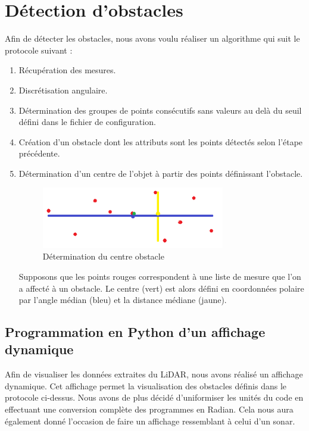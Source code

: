 \section{Détection d'obstacles}

Afin de détecter les obstacles, nous avons voulu réaliser un algorithme qui suit le protocole suivant :
\begin{enumerate}
    \item Récupération des mesures.
    \item Discrétisation angulaire.
    \item Détermination des groupes de points consécutifs sans valeurs au delà du seuil défini dans le fichier de configuration.
    \item Création d'un obstacle dont les attributs sont les points détectés selon l'étape précédente.
    \item Détermination d'un centre de l'objet à partir des points définissant l'obstacle.
    \begin{figure}[htp]
    \centering
    \includegraphics[width=8cm]{images/Detection/centre-object.png}
    \caption{Détermination du centre obstacle}
\end{figure}
\newline
Supposons que les points rouges correspondent à une liste de mesure que l'on a affecté à un obstacle. Le centre (vert) est alors défini en coordonnées polaire par l'angle médian (bleu) et la distance médiane (jaune).
\end{enumerate}

\subsection{Programmation en Python d'un affichage dynamique}
\tab Afin de visualiser les données extraites du LiDAR, nous avons réalisé un affichage dynamique. Cet affichage permet la visualisation des obstacles définis dans le protocole ci-dessus.
Nous avons de plus décidé d’uniformiser les unités du code en effectuant une conversion complète des programmes en Radian.
Cela nous aura également donné l’occasion de faire un affichage ressemblant à celui d’un sonar.

